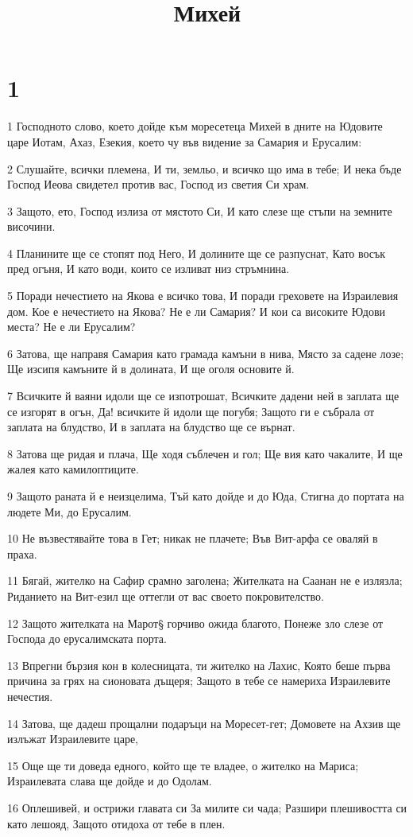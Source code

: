 

\title{Михей}


\chapter{1}

\par 1 Господното слово, което дойде към моресетеца Михей в дните на Юдовите царе Иотам, Ахаз, Езекия, което чу във видение за Самария и Ерусалим:
\par 2 Слушайте, всички племена, И ти, земльо, и всичко що има в тебе; И нека бъде Господ Иеова свидетел против вас, Господ из светия Си храм.
\par 3 Защото, ето, Господ излиза от мястото Си, И като слезе ще стъпи на земните височини.
\par 4 Планините ще се стопят под Него, И долините ще се разпуснат, Като восък пред огъня, И като води, които се изливат низ стръмнина.
\par 5 Поради нечестието на Якова е всичко това, И поради греховете на Израилевия дом. Кое е нечестието на Якова? Не е ли Самария? И кои са високите Юдови места? Не е ли Ерусалим?
\par 6 Затова, ще направя Самария като грамада камъни в нива, Място за садене лозе; Ще изсипя камъните й в долината, И ще оголя основите й.
\par 7 Всичките й ваяни идоли ще се изпотрошат, Всичките дадени ней в заплата ще се изгорят в огън, Да! всичките й идоли ще погубя; Защото ги е събрала от заплата на блудство, И в заплата на блудство ще се върнат.
\par 8 Затова ще ридая и плача, Ще ходя съблечен и гол; Ще вия като чакалите, И ще жалея като камилоптиците.
\par 9 Защото раната й е неизцелима, Тъй като дойде и до Юда, Стигна до портата на людете Ми, до Ерусалим.
\par 10 Не възвестявайте това в Гет; никак не плачете; Във Вит-арфа се оваляй в праха.
\par 11 Бягай, жителко на Сафир срамно заголена; Жителката на Саанан не е излязла; Риданието на Вит-езил ще оттегли от вас своето покровителство.
\par 12 Защото жителката на Марот§ горчиво ожида благото, Понеже зло слезе от Господа до ерусалимската порта.
\par 13 Впрегни бързия кон в колесницата, ти жителко на Лахис, Която беше първа причина за грях на сионовата дъщеря; Защото в тебе се намериха Израилевите нечестия.
\par 14 Затова, ще дадеш прощални подаръци на Моресет-гет; Домовете на Ахзив ще излъжат Израилевите царе,
\par 15 Още ще ти доведа едного, който ще те владее, о жителко на Мариса; Израилевата слава ще дойде и до Одолам.
\par 16 Оплешивей, и острижи главата си За милите си чада; Разшири плешивостта си като лешояд, Защото отидоха от тебе в плен.


